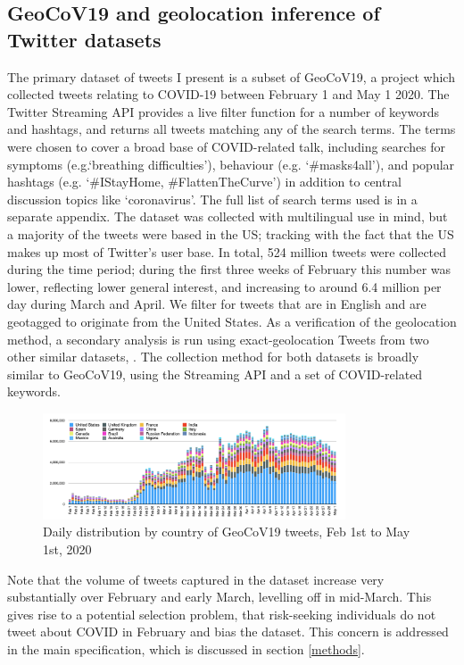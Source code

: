 \documentclass{article}
\begin{document}
\subsection{GeoCoV19 and geolocation inference of Twitter datasets}\label{geocov}
The primary dataset of tweets I present is a subset of GeoCoV19, a project which collected tweets relating to COVID-19 between February 1 and May 1 2020. The Twitter Streaming API provides a live filter function for a number of keywords and hashtags, and returns all tweets matching any of the search terms. The terms were chosen to cover a broad base of COVID-related talk, including searches for symptoms (e.g.`breathing difficulties'), behaviour (e.g. `\#masks4all'), and popular hashtags (e.g. `\#IStayHome, \#FlattenTheCurve') in addition to central discussion topics like `coronavirus'. The full list of search terms used is in a separate appendix. The dataset was collected with multilingual use in mind, but a majority of the tweets were based in the US; tracking with the fact that the US makes up most of Twitter's user base. In total, 524 million tweets were collected during the time period; during the first three weeks of February this number was lower, reflecting lower general interest, and increasing to around 6.4 million per day during March and April. We filter for tweets that are in English and are geotagged to originate from the United States. As a verification of the geolocation method, a secondary analysis is run using exact-geolocation Tweets from two other similar datasets, \textcite{bandaLargescaleCOVID19Twitter2021,lamsalDesignAnalysisLargescale2020}. The collection method for both datasets is broadly similar to GeoCoV19, using the Streaming API and a set of COVID-related keywords. 
\begin{figure}[h!]
    \includegraphics[width=0.8\textwidth]{figs/GeoCov-countrydistribution.png}    
    \centering
    \caption{Daily distribution by country of GeoCoV19 tweets, Feb 1st to May 1st, 2020 \parencite{qaziGeoCoV19DatasetHundreds2020a}}
\end{figure}
Note that the volume of tweets captured in the dataset increase very substantially over February and early March, levelling off in mid-March. This gives rise to a potential selection problem, that risk-seeking individuals do not tweet about COVID in February and bias the dataset. This concern is addressed in the main specification, which is discussed in section \ref{methods}.
\end{document}

